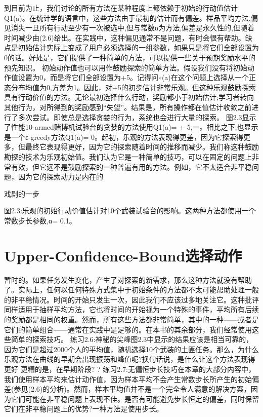 到目前为止，我们讨论的所有方法在某种程度上都依赖于初始的行动值估计Q1(a)。在统计学的语言中，这些方法由于最初的估计而有偏差。样品平均方法,偏见消失一旦所有行动至少有一次被选中,但与常数α为方法,偏差是永久性的,但随着时间减少由(2.6)给出。在实践中，这种偏见通常不是问题，有时会很有帮助。缺点是初始估计实际上变成了用户必须选择的一组参数，如果只是将它们全部设置为0的话。好处是，它们提供了一种简单的方法，可以提供一些关于预期奖励水平的预先知识。
初始动作值也可以用作鼓励探索的简单方法。假设我们没有将初始动作值设置为0，而是将它们全部设置为+5。记得问∗(a)在这个问题上选择从一个正态分布均值为0,方差为1。因此，对+5的初步估计非常乐观。但这种乐观鼓励探索具有行动价值的方法。无论最初选择什么行动，奖励都小于初始估计;学习者转向其他行为，对所得到的奖励感到“失望”。结果是，所有操作都在值估计收敛之前进行了多次尝试。即使总是选择贪婪的行为，系统也会进行大量的探索。
图2.3显示了性能10-armed赌博机试验台的贪婪的方法使用Q1(a)= + 5,一。相比之下,也显示是一个ε-greedy方法Q1(a)= 0。起初，乐观的方法表现得更差，因为它探索得更多，但最终它表现得更好，因为它的探索随着时间的推移而减少。我们称这种鼓励勘探的技术为乐观初始值。我们认为它是一种简单的技巧，可以在固定的问题上非常有效，但它远不是鼓励探索的一种普遍有用的方法。例如，它不太适合非平稳问题，因为它的探索动力是内在的

戏剧的一步

图2.3:乐观的初始行动价值估计对10个武装试验台的影响。这两种方法都使用一个常数步长参数,α= 0.1。

\section{Upper-Confidence-Bound选择动作}

暂时的。如果任务发生变化，产生了对探索的新需求，那么这种方法就没有帮助了。实际上，任何以任何特殊方式集中于初始条件的方法都不太可能帮助处理一般的非平稳情况。时间的开始只发生一次，因此我们不应该过多地关注它。这种批评同样适用于抽样平均方法，它也将时间的开始视为一个特殊的事件，平均所有后续的奖励都是相同的权重。然而，所有这些方法都非常简单，其中的一种——或者是它们的简单组合——通常在实践中是足够的。在本书的其余部分，我们经常使用这些简单的探索技巧。
练习2.6:神秘的尖峰图2.3中显示的结果应该是相当可靠的，因为它们是超过2000个人的平均值，随机选择10个武装的土匪任务。那么，为什么乐观方法在曲线的早期会出现振荡和峰值呢?换句话说，是什么让这个方法表现得更好
更糟的是，在早期阶段? 					?
练习2.7:无偏恒步长技巧在本章的大部分内容中，我们使用样本平均来估计动作值，因为样本平均不会产生常数步长所产生的初始偏差(参见(2.6)的分析)。然而，样本平均值并不是一个完全令人满意的解决方案，因为它们可能在非平稳问题上表现不佳。是否有可能避免步长恒定的偏差，同时保留它们在非平稳问题上的优势?一种方法是使用步长。

